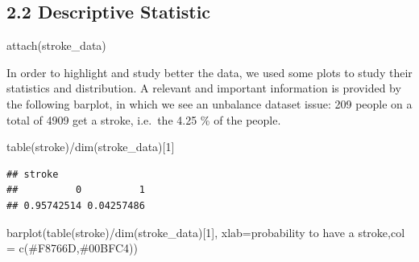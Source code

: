\documentclass[
]{article}
\newenvironment{Shaded}{\begin{snugshade}}{\end{snugshade}}
\newcommand{\AttributeTok}[1]{\textcolor[rgb]{0.77,0.63,0.00}{#1}}
\newcommand{\DecValTok}[1]{\textcolor[rgb]{0.00,0.00,0.81}{#1}}
\newcommand{\FunctionTok}[1]{\textcolor[rgb]{0.00,0.00,0.00}{#1}}
\newcommand{\NormalTok}[1]{#1}
\newcommand{\SpecialCharTok}[1]{\textcolor[rgb]{0.00,0.00,0.00}{#1}}
\newcommand{\StringTok}[1]{\textcolor[rgb]{0.31,0.60,0.02}{#1}}
\begin{document}
\hypertarget{descriptive-statistic}{%
\subsection{2.2 Descriptive Statistic}\label{descriptive-statistic}}

\begin{Shaded}
\begin{Highlighting}[]
\FunctionTok{attach}\NormalTok{(stroke\_data)}
\end{Highlighting}
\end{Shaded}

In order to highlight and study better the data, we used some plots to
study their statistics and distribution. A relevant and important
information is provided by the following barplot, in which we see an
unbalance dataset issue: 209 people on a total of 4909 get a stroke,
i.e.~the 4.25 \% of the people.

\begin{Shaded}
\begin{Highlighting}[]
\FunctionTok{table}\NormalTok{(stroke)}\SpecialCharTok{/}\FunctionTok{dim}\NormalTok{(stroke\_data)[}\DecValTok{1}\NormalTok{]}
\end{Highlighting}
\end{Shaded}

\begin{verbatim}
## stroke
##          0          1 
## 0.95742514 0.04257486
\end{verbatim}

\begin{Shaded}
\begin{Highlighting}[]
\FunctionTok{barplot}\NormalTok{(}\FunctionTok{table}\NormalTok{(stroke)}\SpecialCharTok{/}\FunctionTok{dim}\NormalTok{(stroke\_data)[}\DecValTok{1}\NormalTok{],}
        \AttributeTok{xlab=}\StringTok{\textquotesingle{}probability to have a stroke\textquotesingle{}}\NormalTok{,}\AttributeTok{col =} \FunctionTok{c}\NormalTok{(}\StringTok{\textquotesingle{}\#F8766D\textquotesingle{}}\NormalTok{,}\StringTok{\textquotesingle{}\#00BFC4\textquotesingle{}}\NormalTok{))}
\end{Highlighting}
\end{Shaded}
\end{document}
